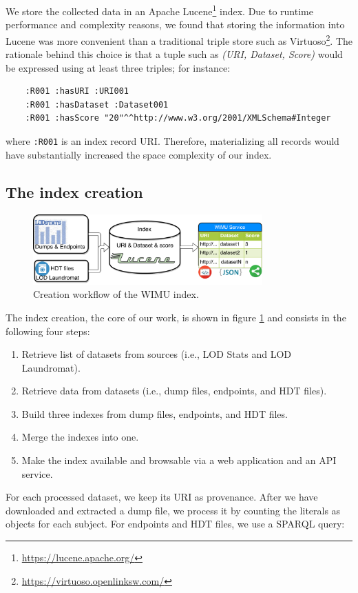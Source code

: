 We store the collected data in an Apache Lucene\footnote{\url{https://lucene.apache.org/}} index.
Due to runtime performance and complexity reasons, we found that storing the information into Lucene was more convenient than a traditional triple store such as Virtuoso\footnote{\url{https://virtuoso.openlinksw.com/}}.
The rationale behind this choice is that a tuple such as \emph{(URI, Dataset, Score)} would be expressed using at least three triples; for instance:
\begin{verbatim}
    :R001 :hasURI :URI001
    :R001 :hasDataset :Dataset001
    :R001 :hasScore "20"^^http://www.w3.org/2001/XMLSchema#Integer
\end{verbatim}
where \texttt{:R001} is an index record URI. Therefore, materializing all records would have substantially increased the space complexity of our index.

\subsection{The index creation}

\begin{figure}[htb] 
	\centering
	\includegraphics[width=250pt]{img/arq.pdf}
	\caption{Creation workflow of the WIMU index.}
	\label{fig:flow1}
\end{figure}

The index creation, the core of our work, is shown in figure \ref{fig:flow1} and consists in the following four steps:
\begin{enumerate}		
	\item Retrieve list of datasets from sources (i.e., LOD Stats and LOD Laundromat).
	\item Retrieve data from datasets (i.e., dump files, endpoints, and HDT files).
	\item Build three indexes from dump files, endpoints, and HDT files.
	\item Merge the indexes into one.
	\item Make the index available and browsable via a web application and an API service.
\end{enumerate}

For each processed dataset, we keep its URI as provenance.
After we have downloaded and extracted a dump file, we process it by counting the literals as objects for each subject.
For endpoints and HDT files, we use a SPARQL query:

